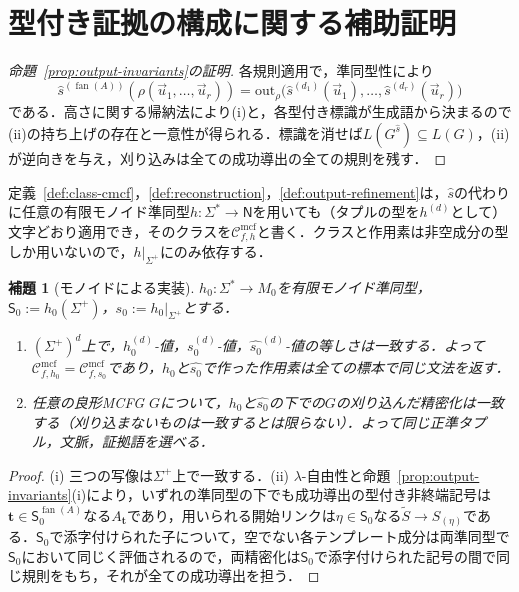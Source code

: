 \documentclass[11pt,a4paper]{ltjsarticle}
\numberwithin{equation}{section}
\theoremstyle{plain}
\newtheorem{lemma}[theorem]{補題}
\theoremstyle{definition}
\theoremstyle{remark}
\newcommand{\Cmcf}[2]{\mathcal{C}^{\mathrm{mcf}}_{#1,#2}}
\newcommand{\out}{\mathrm{out}}
\newcommand{\tuple}[1]{\vec{#1}}
\newcommand{\fan}{\operatorname{fan}}
\begin{document}
\section{型付き証拠の構成に関する補助証明}
\label{app:typed-witness-aux-proofs}

\begin{proof}[命題~\ref{prop:output-invariants}の証明]
各規則適用で，準同型性により
\[
 \widehat s^{(\fan(A))}(\rho(\tuple u_1,\ldots,\tuple u_r))=
 \out_\rho\bigl(\widehat s^{(d_1)}(\tuple u_1),\ldots,\widehat s^{(d_r)}(\tuple u_r)\bigr)
\]
である．高さに関する帰納法により(i)と，各型付き標識が生成語から決まるので(ii)の持ち上げの存在と一意性が得られる．標識を消せば$L(G^{\widehat s})\subseteq L(G)$，(ii)が逆向きを与え，刈り込みは全ての成功導出の全ての規則を残す．
\end{proof}

定義~\ref{def:class-cmcf}，\ref{def:reconstruction}，\ref{def:output-refinement}は，$\widehat s$の代わりに任意の有限モノイド準同型$h:\Sigma^*\to\mathsf N$を用いても（タプルの型を$h^{(d)}$として）文字どおり適用でき，そのクラスを$\Cmcf{f}{h}$と書く．クラスと作用素は非空成分の型しか用いないので，$h|_{\Sigma^+}$にのみ依存する．

\begin{lemma}[モノイドによる実装]
\label{lem:semigroup-transfer}
$h_0:\Sigma^*\to M_0$を有限モノイド準同型，$\mathsf S_0:=h_0(\Sigma^+)$，$s_0:=h_0|_{\Sigma^+}$とする．
\begin{enumerate}[label=\textup{(\roman*)}]
\item $(\Sigma^+)^d$上で，$h_0^{(d)}$-値，$s_0^{(d)}$-値，$\widehat{s_0}^{(d)}$-値の等しさは一致する．よって$\Cmcf{f}{h_0}=\Cmcf{f}{s_0}$であり，$h_0$と$\widehat{s_0}$で作った作用素は全ての標本で同じ文法を返す．
\item 任意の良形MCFG $G$について，$h_0$と$\widehat{s_0}$の下での$G$の刈り込んだ精密化は一致する（刈り込まないものは一致するとは限らない）．よって同じ正準タプル，文脈，証拠語を選べる．
\end{enumerate}
\end{lemma}

\begin{proof}
(i) 三つの写像は$\Sigma^+$上で一致する．(ii) $\lambda$-自由性と命題~\ref{prop:output-invariants}(i)により，いずれの準同型の下でも成功導出の型付き非終端記号は$\mathbf t\in \mathsf S_0^{\fan(A)}$なる$A_{\mathbf t}$であり，用いられる開始リンクは$\eta\in \mathsf S_0$なる$\widetilde S\to S_{(\eta)}$である．$\mathsf S_0$で添字付けられた子について，空でない各テンプレート成分は両準同型で$\mathsf S_0$において同じく評価されるので，両精密化は$\mathsf S_0$で添字付けられた記号の間で同じ規則をもち，それが全ての成功導出を担う．
\end{proof}
\end{document}
